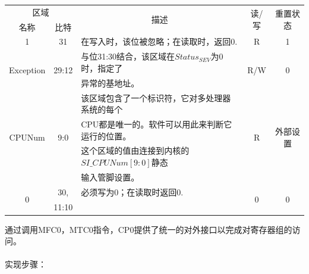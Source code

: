 \begin{table}[H]
\centering
\begin{tabular}{|c|c|c|c|c|}
\hline
\multicolumn{2}{|c|}{区域}&
\multirow{2}{*}{描述}&
\multirow{2}{*}{读/写}&
\multirow{2}{*}{重置状态}\\
\cline{1-2}
名称&比特&&&\\
\hline
1&31&
\multicolumn{1}{l|}{在写入时，该位被忽略；在读取时，返回0.}&
R&1\\
\hline
\multirow{2}{*}{Exception}&
\multirow{2}{*}{29:12}&
\multicolumn{1}{l|}{与位31:30结合，该区域在$Status_{SEV}$为0时，指定了}&
\multirow{2}{*}{R/W}&
\multirow{2}{*}{0}\\
&&
\multicolumn{1}{l|}{异常的基地址。}&
&\\
\hline
\multirow{4}{*}{CPUNum}&
\multirow{4}{*}{9:0}&
\multicolumn{1}{l|}{该区域包含了一个标识符，它对多处理器系统的每个}&
\multirow{4}{*}{R}&
\multirow{4}{*}{外部设置}\\
&&
\multicolumn{1}{l|}{CPU都是唯一的。软件可以用此来判断它运行的位置。}&
&\\
&&
\multicolumn{1}{l|}{这个区域的值由连接到内核的$SI\_CPUNum[9:0]$静态}&
&\\
&&
\multicolumn{1}{l|}{输入管脚设置。}&
&\\
\hline
\multirow{2}{*}{0}&
30,&
\multicolumn{1}{l|}{必须写为0；在读取时返回0.}&
\multirow{2}{*}{0}&
\multirow{2}{*}{0}\\
&11:10&&&\\
\hline
\end{tabular}
\end{table}

通过调用MFC0，MTC0指令，CP0提供了统一的对外接口以完成对寄存器组的访问。\\\\
实现步骤：


